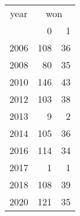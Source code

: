 \footnotesize\begin{tabular}[t]{lrr}
\toprule
\multicolumn{1}{c}{year} & \multicolumn{2}{c}{won} \\
\cmidrule(l{3pt}r{3pt}){1-1} \cmidrule(l{3pt}r{3pt}){2-3}
  & 0 & 1\\
\midrule
2006 & 108 & 36\\
2008 & 80 & 35\\
2010 & 146 & 43\\
2012 & 103 & 38\\
2013 & 9 & 2\\
2014 & 105 & 36\\
2016 & 114 & 34\\
2017 & 1 & 1\\
2018 & 108 & 39\\
2020 & 121 & 35\\
\bottomrule
\end{tabular}
